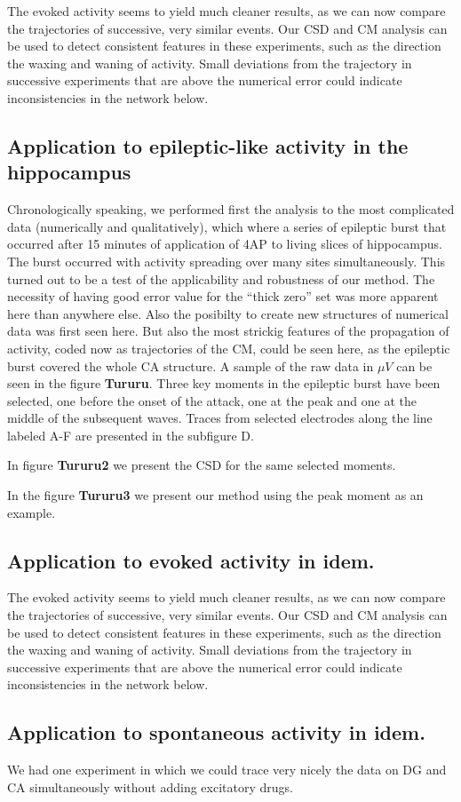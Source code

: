 \documentclass{article}
\begin{document}
The evoked activity seems to yield much cleaner results, as we can now compare the trajectories of successive, very similar events. Our CSD and CM analysis can be used to detect consistent features in these experiments, such as the direction the waxing and waning of activity. Small deviations from the trajectory in successive experiments that are above the numerical error could indicate inconsistencies in the network below. 



\subsection{Application to epileptic-like activity in the hippocampus}
Chronologically speaking, we performed first the analysis to the most complicated data (numerically and qualitatively), which where a series of epileptic burst that occurred after 15 minutes of application of 4AP to living slices of hippocampus. The burst occurred with activity spreading over many sites simultaneously. This turned out to be a test of the applicability and robustness of our method. The necessity of having good error value for the ``thick zero'' set was more apparent here than anywhere else. Also the posibilty to create new structures of numerical data was first seen here.  But also the most strickig features of the propagation of activity, coded now as trajectories of the CM, could be seen here, as the epileptic burst covered the whole CA structure. A sample of the raw data in $\mu V$ can be seen in the figure \textbf{Tururu}. Three key moments in the epileptic burst have been selected, one before the onset of the attack, one at the peak and one at the middle of the subsequent waves. Traces from selected electrodes along the line labeled A-F are presented in the subfigure D. 

In figure \textbf{Tururu2} we present the CSD for the same selected moments.

In the figure \textbf{Tururu3} we present our method using the peak moment as an example. 


\subsection{Application to evoked activity in idem.}

The evoked activity seems to yield much cleaner results, as we can now compare the trajectories of successive, very similar events. Our CSD and CM analysis can be used to detect consistent features in these experiments, such as the direction the waxing and waning of activity. Small deviations from the trajectory in successive experiments that are above the numerical error could indicate inconsistencies in the network below. 

\subsection{Application to spontaneous activity in idem.}

We had one experiment in which we could trace very nicely the data on DG and CA simultaneously without adding excitatory drugs. 


 
\end{document}
